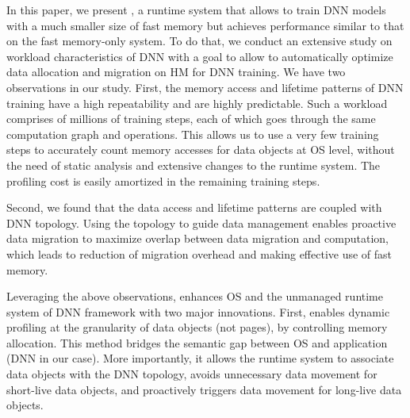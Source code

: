 In this paper, we present \textit{\name}, %
\textcolor{check}{a runtime system that allows to train DNN models with a much smaller size of fast memory but achieves performance similar to that on the fast memory-only system. To do that, we conduct an extensive study on workload characteristics of DNN with a goal to allow \name to automatically optimize data allocation and migration on HM for DNN training. We have two observations in our study. }
First, %
\textcolor{check}{the memory access and lifetime patterns of DNN training have a high repeatability and are highly predictable.}
Such a workload comprises of millions of training steps, each of which goes through the \textcolor{check}{same computation graph and operations.} This allows us to use a very few training steps to accurately count memory accesses for data objects at OS level, without the need of static analysis and extensive changes to the runtime system. The profiling cost is easily amortized in the remaining training steps.

Second, we found that the data access and lifetime patterns are coupled with DNN topology.  
Using the topology to guide data management enables proactive data migration to maximize overlap between data migration and computation, which leads to  reduction of migration overhead and making effective use of fast memory. 

Leveraging the above observations, \name enhances OS and the \textcolor{check}{unmanaged} runtime system of DNN framework with two major innovations. First, \name enables dynamic profiling at the granularity of data objects (not pages), by controlling memory allocation.  This method bridges the semantic gap between OS and application (DNN in our case). More importantly, it allows the runtime system to associate data objects with the DNN topology, 
\textcolor{check}{avoids unnecessary data movement for short-live data objects, and proactively triggers data movement for long-live data objects.
} 

